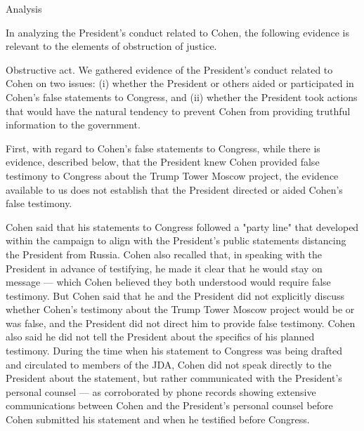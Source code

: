 {Analysis

In analyzing the President's conduct related to Cohen, the following evidence is relevant to the elements of obstruction of justice.

Obstructive act.
We gathered evidence of the President's conduct related to Cohen on two issues:
(i) whether the President or others aided or participated in Cohen's false statements to Congress, and
(ii) whether the President took actions that would have the natural tendency to prevent Cohen from providing truthful information to the government.

First, with regard to Cohen's false statements to Congress, while there is evidence, described below, that the President knew Cohen provided false testimony to Congress about the Trump Tower Moscow project, the evidence available to us does not establish that the President directed or aided Cohen's false testimony.

Cohen said that his statements to Congress followed a "party line" that developed within the campaign to align with the President's public statements distancing the President from Russia.
Cohen also recalled that, in speaking with the President in advance of testifying, he made it clear that he would stay on message — which Cohen believed they both understood would require false testimony.
But Cohen said that he and the President did not explicitly discuss whether Cohen's testimony about the Trump Tower Moscow project would be or was false, and the President did not direct him to provide false testimony.
Cohen also said he did not tell the President about the specifics of his planned testimony.
During the time when his statement to Congress was being drafted and circulated to members of the JDA, Cohen did not speak directly to the President about the statement, but rather communicated with the President's personal counsel — as corroborated by phone records showing extensive communications between Cohen and the President's personal counsel before Cohen submitted his statement and when he testified before Congress.

}
